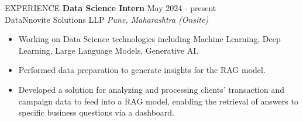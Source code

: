 \documentclass{resume} %
\begin{document}
\begin{rSection}{EXPERIENCE}
\textbf{Data Science Intern} \hfill May 2024 - present\\
DataNnovite Solutions LLP \hfill \textit{Pune, Maharashtra (Onsite)}
\begin{itemize}[leftmargin=0.5in]
    \itemsep -3pt {}
    \item Working on Data Science technologies including Machine Learning, Deep Learning, Large Language Models, Generative AI.
    \item Performed data preparation to generate insights for the RAG model.
    \item Developed a solution for analyzing and processing clients' transaction and campaign data to feed into a RAG model, enabling the retrieval of answers to specific business questions via a dashboard.
\end{itemize}
\end{rSection}
\end{document}
